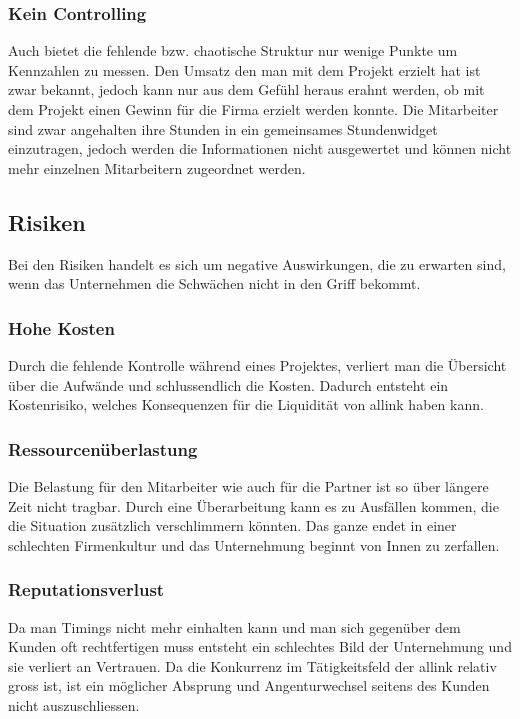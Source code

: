 \subsubsection{Kein Controlling}
Auch bietet die fehlende bzw. chaotische Struktur nur wenige Punkte um Kennzahlen
zu messen. Den Umsatz den man mit dem Projekt erzielt hat ist zwar bekannt,
jedoch kann nur aus dem Gefühl heraus erahnt werden, ob mit dem Projekt einen
Gewinn für die Firma erzielt werden konnte. Die Mitarbeiter sind zwar angehalten
ihre Stunden in ein gemeinsames Stundenwidget einzutragen, jedoch werden
die Informationen nicht ausgewertet und können nicht mehr einzelnen Mitarbeitern
zugeordnet werden.

\subsection{Risiken}
Bei den Risiken handelt es sich um negative Auswirkungen, die zu erwarten sind,
wenn das Unternehmen die Schwächen nicht in den Griff bekommt.

\subsubsection{Hohe Kosten}
Durch die fehlende Kontrolle während eines Projektes, verliert man die
Übersicht über die Aufwände und schlussendlich die Kosten. Dadurch entsteht
ein Kostenrisiko, welches Konsequenzen für die Liquidität von allink haben kann.

\subsubsection{Ressourcenüberlastung}
Die Belastung für den Mitarbeiter wie auch für die Partner ist so über
längere Zeit nicht tragbar. Durch eine Überarbeitung kann es zu Ausfällen kommen, die
die Situation zusätzlich verschlimmern könnten. Das ganze endet in einer 
schlechten Firmenkultur und das Unternehmung beginnt von Innen zu zerfallen.

\subsubsection{Reputationsverlust}
Da man Timings nicht mehr einhalten kann und man sich gegenüber dem Kunden
oft rechtfertigen muss entsteht ein schlechtes Bild der Unternehmung und sie
verliert an Vertrauen. Da die Konkurrenz im Tätigkeitsfeld der allink relativ
gross ist, ist ein möglicher Absprung und Angenturwechsel seitens des Kunden nicht 
auszuschliessen.
